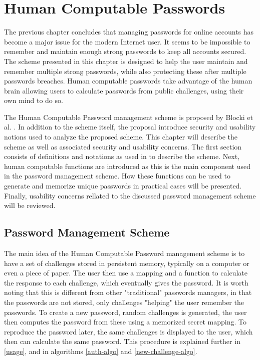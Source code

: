 \chapter{Human Computable Passwords}\label{ch:hcp}
The previous chapter concludes that managing passwords for online accounts has become a major issue for the modern Internet user. It seems to be impossible to remember and maintain enough strong passwords to keep all accounts secured. The scheme presented in this chapter is designed to help the user maintain and remember multiple strong passwords, while also protecting these after multiple passwords breaches. Human computable passwords take advantage of the human brain allowing users to calculate passwords from public challenges, using their own mind to do so. 

\par The Human Computable Password management scheme is proposed by Blocki et al. \cite{hcp-blocki}. In addition to the scheme itself, the proposal introduce security and usability notions used to analyze the proposed scheme. This chapter will describe the scheme as well as associated security and usability concerns. The first section consists of definitions and notations as used in \cite{hcp-blocki} to describe the scheme. Next, human computable functions are introduced as this is the main component used in the password management scheme. How these functions can be used to generate and memorize unique passwords in practical cases will be presented. Finally, usability concerns rellated to the discussed password management scheme will be reviewed.

\section{Password Management Scheme}
The main idea of the Human Computable Password management scheme is to have a set of challenges stored in persistent memory, typically on a computer or even a piece of paper. The user then use a mapping and a function to calculate the response to each challenge, which eventually gives the password. It is worth noting that this is different from other "traditional" passwords managers, in that the passwords are not stored, only challenges "helping" the user remember the passwords. To create a new password, random challenges is generated, the user then computes the password from these using a memorized secret mapping. To reproduce the password later, the same challenges is displayed to the user, which then can calculate the same password. This procedure is explained further in \autoref{usage}, and in algorithms \ref{auth-algo} and \autoref{new-challenge-algo}.

